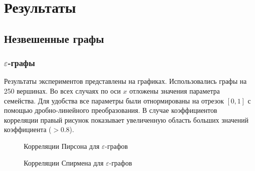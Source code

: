 \chapter{Результаты} \label{chapt3}


\section{Незвешенные графы} \label{sect3_1}

\subsection{$\varepsilon$-графы} \label{sect3_1_1}

Результаты экспериментов представлены на графиках. Использовались графы на 250 вершинах.
Во всех случаях по оси $x$ отложены значения параметра семейства. Для удобства все параметры были отнормированы на отрезок $[0,1]$ с помощью дробно-линейного преобразования. В случае коэффициентов корреляции правый рисунок показывает увеличенную область больших значений коэффициента ($>0.8$).

\begin{figure}[h]
  \begin{minipage}[h]{0.49\linewidth}
  \end{minipage}
  \hfill
  \begin{minipage}[h]{0.49\linewidth}
  \end{minipage}

  \caption{Корреляции Пирсона для $\varepsilon$-графов}
  \label{img:eps_graphs}  
\end{figure}

\begin{figure}[h]
  \begin{minipage}[h]{0.49\linewidth}
  \end{minipage}
  \hfill
  \begin{minipage}[h]{0.49\linewidth}
  \end{minipage}

  \caption{Корреляции Спирмена для $\varepsilon$-графов}
  \label{img:eps_graphs_sp}  
\end{figure}

